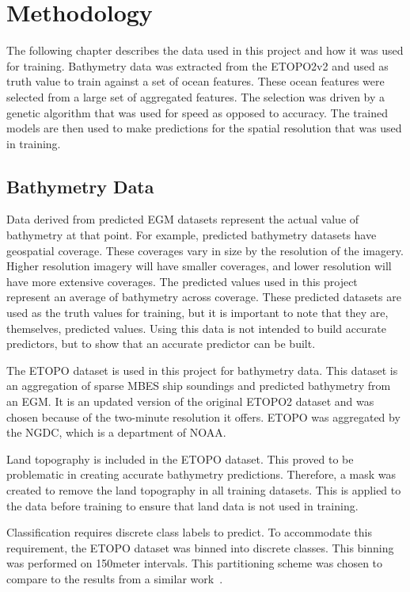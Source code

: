 \section{Methodology}
\setlength{\parindent}{10ex}
The following chapter describes the data used in this project and how it was used for training.
Bathymetry data was extracted from the \ac{ETOPO}2v2 and used as truth value to train against a set of ocean features.
These ocean features were selected from a large set of aggregated features.
The selection was driven by a genetic algorithm that was used for speed as opposed to accuracy.
The trained models are then used to make predictions for the spatial resolution that was used in training.

\subsection{Bathymetry Data}
Data derived from predicted \ac{EGM} datasets represent the actual value of bathymetry at that point.
For example, predicted bathymetry datasets have geospatial coverage.
These coverages vary in size by the resolution of the imagery.
Higher resolution imagery will have smaller coverages, and lower resolution will have more extensive coverages.
The predicted values used in this project represent an average of bathymetry across coverage. 
These predicted datasets are used as the truth values for training, but it is important to note that they are, themselves, predicted values.
Using this data is not intended to build accurate predictors, but to show that an accurate predictor can be built.

\par
The \ac{ETOPO} dataset is used in this project for bathymetry data.
This dataset is an aggregation of sparse \ac{MBES} ship soundings and predicted bathymetry from an \ac{EGM}.
It is an updated version of the original ETOPO2 dataset and was chosen because of the two-minute resolution it offers.
\ac{ETOPO} was aggregated by the \ac{NGDC}, which is a department of \ac{NOAA}.

\par
Land topography is included in the \ac{ETOPO} dataset.
This proved to be problematic in creating accurate bathymetry predictions.
Therefore, a mask was created to remove the land topography in all training datasets.
This is applied to the data before training to ensure that land data is not used in training.

\par
Classification requires discrete class labels to predict.
To accommodate this requirement, the \ac{ETOPO} dataset was binned into discrete classes.
This binning was performed on 150\-meter intervals.
This partitioning scheme was chosen to compare to the results from a similar work~\cite{jena2012prediction}.

